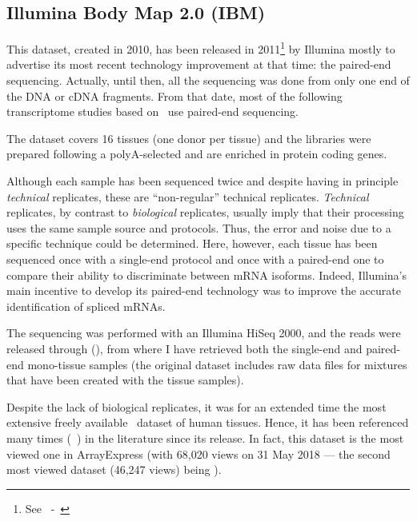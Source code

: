 \subsection{Illumina Body Map 2.0 (IBM)}\label{subsec:ibmpresentation}
\vspace*{-0.2in}
This dataset, created in 2010, has been released in
2011\footnote{See~ -~\cite{ibmEnsembl}} by Illumina
mostly to advertise its most recent technology improvement at that time:
the paired-end sequencing. Actually, until then, all the sequencing was done
from only one end of the \gls{DNA} or \gls{cDNA} fragments. From that
date, most of the following transcriptome studies based on \Rnaseq\ use
paired-end sequencing.\mybr\

The dataset covers 16 tissues (one donor per tissue) and
the libraries were prepared following a polyA-selected
and are enriched in protein coding genes.\mybr\

Although each sample has been sequenced twice and despite having in principle
\emph{technical} replicates, these are ``non-regular'' technical replicates.
\emph{Technical} replicates, by contrast to \emph{biological} replicates,
usually imply that their processing uses the same sample source and protocols.
Thus, the error and noise due to a specific technique could be determined.
Here, however, each tissue has been sequenced once with a single-end protocol
and once with a paired-end one to compare their ability to discriminate between
\gls{mRNA} isoforms.
Indeed, Illumina's main incentive to develop its paired-end
technology was to improve the accurate identification of spliced \glspl{mRNA}.\mybr\

The sequencing was performed with an Illumina HiSeq 2000, and the reads were
released through  (),
from where I have retrieved both the single-end and paired-end mono-tissue samples
(the original dataset includes raw data files for mixtures
that have been created with the tissue samples).\mybr\

Despite the lack of biological replicates,
it was for an extended time
the most extensive freely available \Rnaseq\ dataset of human tissues.
Hence, it has been referenced many times
(\eg\ \citet{Asmann2012-in,ibmrelatedpaper,Smith2012-jw,Derrien2012-ej,%
Florea2013-in,tophat2,Kechavarzi2014-oi,Zhao2014-xj,Pasquali2014-zj,Corpas2014-ej,%
Petryszak2014-kj,Brown2015-co,Janes2015-wn,%
De_Simone2016-fb,Kern2016-dv,Iwakiri2016-sr,Yao2017-gj,Akers2018-cf})
in the literature since its release.
In fact, this dataset is the most viewed one in \gls{ArrayExpress}
(with 68,020 views on 31 May 2018 ---
the second most viewed dataset (46,247 views)
being ).\mybr\

